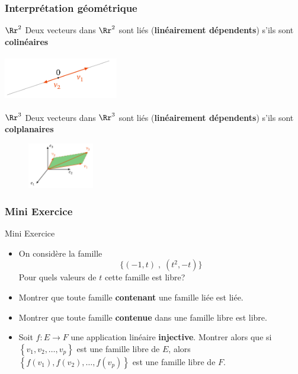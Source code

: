 \documentclass[dvipsnames]{beamer}
\begin{document}
\begin{frame}[t]
  \frametitle{Interprétation géométrique}
     \begin{block}{$\Rr^2$}
       \small Deux vecteurs dans $\Rr^2$ sont liés (\textbf{linéairement dépendents}) s'ils
       sont \textbf{\alert{colinéaires}} 
     \end{block}
       \centering
       \includegraphics[width=5cm, height=2cm]{./col_r2.png}

     \begin{block}{$\Rr^3$}
       \small
       \small Deux vecteurs dans $\Rr^3$ sont liés (\textbf{linéairement dépendents}) s'ils
       sont \textbf{\alert{colplanaires}} 
     \end{block}
    \centering
    \includegraphics[width=5cm, height=2cm]{./col_r3.png}
\end{frame}
\begin{frame}[t]
  \frametitle{Mini Exercice}
  
  \begin{block}{Mini Exercice}
    \begin{itemize}
      \scriptsize
      \item On considère la famille
        \begin{equation}
          \big\{(-1,t)\;,\; (t^2,-t)\big\}
        \end{equation}
        Pour quels valeurs de $t$ cette famille est libre?\\[6pt]
        \scriptsize
      \item Montrer que toute famille \textbf{contenant} une famille liée est
        liée.\\[6pt]
      \item Montrer que toute famille \textbf{contenue} dans une famille libre
        est libre.\\[6pt]
      \item Soit $f: E\longrightarrow F$ une application linéaire
        \textbf{injective}. Montrer alors que si
        $\left\{v_1,v_2,\ldots,v_p\right\}$ est une famille libre de $E$, alors
        $\left\{f(v_1),f(v_2),\ldots, f(v_p)\right\}$ est une famille libre de $F$.
    \end{itemize}
  \end{block}
\end{frame}
\end{document}
